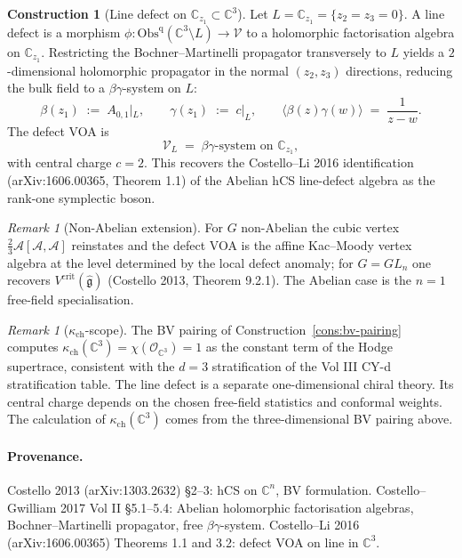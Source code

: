 \documentclass[11pt]{amsart}
\providecommand{\C}{\mathbb{C}}
\providecommand{\g}{\mathfrak{g}}
\providecommand{\Obs}{\mathrm{Obs}}
\providecommand{\kch}{\kappa_{\mathrm{ch}}}
\theoremstyle{plain}
\theoremstyle{definition}
\newtheorem{construction}[theorem]{Construction}
\theoremstyle{remark}
\newtheorem{remark}[theorem]{Remark}
\begin{document}
\begin{construction}[Line defect on $\C_{z_1} \subset \C^3$]
\label{cons:line-defect}
Let $L = \C_{z_1} = \{z_2 = z_3 = 0\}$. A line defect is a morphism
$\phi \colon \Obs^{\mathrm{q}}(\C^3 \setminus L) \to \mathcal{V}$ to a
holomorphic factorisation algebra on $\C_{z_1}$. Restricting the
Bochner--Martinelli propagator transversely to $L$ yields a $2$-dimensional
holomorphic propagator in the normal $(z_2, z_3)$ directions, reducing the
bulk field to a $\beta\gamma$-system on $L$:
\[
\beta(z_1) \;:=\; A_{0,1}|_{L}, \qquad \gamma(z_1) \;:=\; c|_{L},
\qquad \langle \beta(z) \gamma(w) \rangle \;=\; \frac{1}{z-w}.
\]
The defect VOA is
\[
\mathcal{V}_L \;=\; \beta\gamma\text{-system on } \C_{z_1},
\]
with central charge $c = 2$. This recovers the Costello--Li 2016
identification (arXiv:1606.00365, Theorem 1.1) of the Abelian hCS
line-defect algebra as the rank-one symplectic boson.
\end{construction}

\begin{remark}[Non-Abelian extension]
\label{rem:non-ab}
For $G$ non-Abelian the cubic vertex $\tfrac{2}{3} \mathcal{A} [\mathcal{A}, \mathcal{A}]$
reinstates and the defect VOA is the affine Kac--Moody vertex algebra
at the level determined by the local defect anomaly; for
$G = GL_n$ one recovers $V^{\mathrm{crit}}(\widehat{\g})$ (Costello 2013,
Theorem 9.2.1). The Abelian case is the $n = 1$ free-field
specialisation.
\end{remark}

\begin{remark}[$\kch$-scope]
\label{rem:kch-scope}
The BV pairing of Construction~\ref{cons:bv-pairing} computes
$\kch(\C^3) = \chi(\mathcal{O}_{\C^3}) = 1$ as the constant term of
the Hodge supertrace, consistent with the $d=3$ stratification of
the Vol III CY-d stratification table. The line defect is a separate
one-dimensional chiral theory. Its central charge depends on the chosen
free-field statistics and conformal weights. The calculation of
$\kch(\C^3)$ comes from the three-dimensional BV pairing above.
\end{remark}

\paragraph{Provenance.}
Costello 2013 (arXiv:1303.2632) §2--3: hCS on $\C^n$, BV formulation.
Costello--Gwilliam 2017 Vol II §5.1--5.4: Abelian holomorphic
factorisation algebras, Bochner--Martinelli propagator, free
$\beta\gamma$-system.
Costello--Li 2016 (arXiv:1606.00365) Theorems 1.1 and 3.2: defect VOA
on line in $\C^3$.
\end{document}

